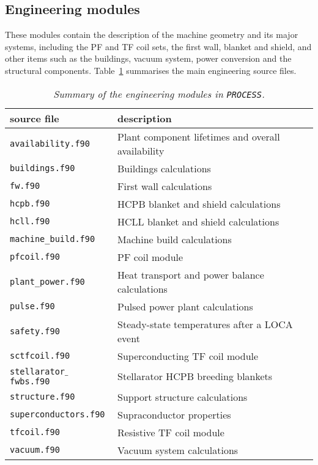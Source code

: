 \documentclass[11pt,a4paper]{report}
\newcommand{\process}{\mbox{\texttt{PROCESS}}}
\begin{document}
\subsection{Engineering modules}

These modules contain the description of the machine geometry and its major
systems, including the PF and TF coil sets, the first wall, blanket and
shield, and other items such as the buildings, vacuum system, power conversion
and the structural components.  Table~\ref{tab:engineering} summarises the main
engineering source files.

\begin{table}[tbph]
\begin{center}

\begin{tabular}{||l||l||}
	\hline
source file     & description \\ 
	\hline
\texttt{availability.f90}   	 & Plant component lifetimes and overall availability \\
\texttt{buildings.f90}      	 & Buildings calculations \\
\texttt{fw.f90}             	 & First wall calculations \\
\texttt{hcpb.f90}           	 & HCPB blanket and shield calculations \\
\texttt{hcll.f90}           	 & HCLL blanket and shield calculations \\
\texttt{machine\_build.f90} 	 & Machine build calculations \\
\texttt{pfcoil.f90}         	 & PF coil module \\
\texttt{plant\_power.f90}        & Heat transport and power balance calculations \\
\texttt{pulse.f90}               & Pulsed power plant calculations \\
\texttt{safety.f90}              & Steady-state temperatures after a LOCA event \\
\texttt{sctfcoil.f90}            & Superconducting TF coil module\\
\texttt{stellarator$\_$fwbs.f90} & Stellarator HCPB breeding blankets \\
\texttt{structure.f90}      	 & Support structure calculations \\
\texttt{superconductors.f90}     & Supraconductor properties \\
\texttt{tfcoil.f90}              & Resistive TF coil module \\
\texttt{vacuum.f90}        		 & Vacuum system calculations \\
	\hline
\end{tabular}
\end{center}
\caption[Summary of engineering modules]
{\label{tab:engineering}
  \textit{Summary of the engineering modules in \process.}
}
\end{table}
\end{document}

